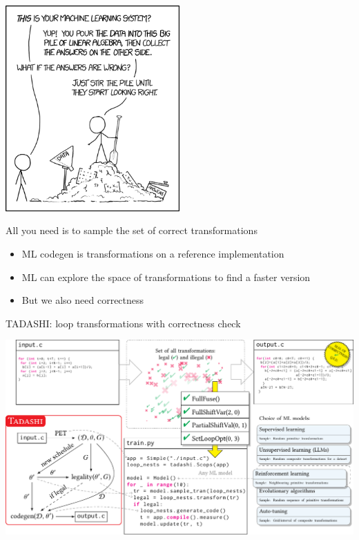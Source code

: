 \documentclass[presentation, aspectratio=169]{beamer}
\begin{document}
\begin{frame}[label={sec:orgdb69c7f}]{}
\begin{center}
\includegraphics[width=0.5\textwidth]{./figs/xkcd.png}
\end{center}
\end{frame}
\begin{frame}[label={sec:org35fc1b0}]{All you need is to sample the set of correct transformations}
\begin{itemize}
\item <+-> \alert{ML codegen is transformations} on a reference implementation
\item <+-> ML can \alert{explore the space of transformations} to find a faster version
\item <+-> But we also need \alert{correctness}
\end{itemize}
\end{frame}
\begin{frame}[label={sec:org7790027}]{TADASHI: \alert{loop transformations} with correctness check}
\begin{center}
\includegraphics[width=.9\linewidth]{./figs/sampling.pdf}
\end{center}
\end{frame}
\end{document}
